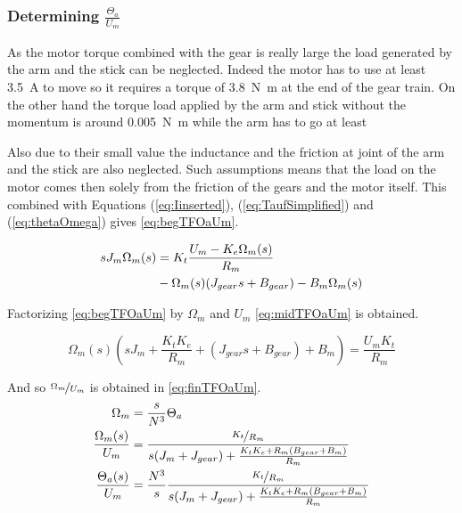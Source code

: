 \subsubsection{Determining $\frac{\Theta_a}{U_m}$ }


As the motor torque combined with the gear is really large the load generated by the arm and the stick can be neglected. Indeed the motor has to use at least \SI{3.5}{\ampere} to move so it requires a torque of \SI{3.8}{\newton\meter} at the end of the gear train. On the other hand the torque load applied by the arm and stick without the momentum is around \SI{0.005}{\newton\meter} while the arm has to go at least 

Also due to their small value the inductance and the friction at joint of the arm and the stick are also neglected. Such assumptions means that the load on the motor comes then solely from the friction of the gears and the motor itself. This combined with Equations (\ref{eq:Iinserted}), (\ref{eq:TaufSimplified}) and (\ref{eq:thetaOmega}) gives \autoref{eq:begTFOaUm}.


\begin{align}\label{eq:begTFOaUm}
	s J_{m} \Omega_m(s) &=K_{t} \frac{U_m-K_e \Omega_m(s)}{R_m} \notag \\ 
	&- \Omega_m(s) (J_{gear}s+B_{gear}) - B_{m} \Omega_m(s) \addunit{1}
\end{align}

Factorizing \autoref{eq:begTFOaUm} by $\Omega_m$ and $U_m$ \autoref{eq:midTFOaUm} is obtained.

\begin{equation}\label{eq:midTFOaUm}
	\Omega_m(s)\left(s J_m+\frac{K_t K_e}{ R_m} + (J_{gear}s+B_{gear}) + B_{m}  \right)=\frac{U_m K_t}{R_m}	
\end{equation}

And so $\nicefrac{\Omega_m}{U_m}$ is obtained in \autoref{eq:finTFOaUm}.
\begin{subequations}\label{eq:finTFOaUm}
	\begin{align}
		\Omega_m&=\frac{s}{N^3}\Theta_a\\
		\frac{\Omega_m(s)}{U_m}&=\frac{\nicefrac{ K_t}{R_m}}{s(J_m+J_{gear})+\frac{K_t K_e +R_m (B_{gear}+B_m)}{R_m}} \\
		\frac{\Theta_a(s)}{U_m}&=\frac{N^3}{s}\frac{\nicefrac{K_t}{R_m}}{s(J_m+J_{gear})+\frac{K_t K_e +R_m (B_{gear}+B_m)}{R_m}}
	\end{align}
\end{subequations}